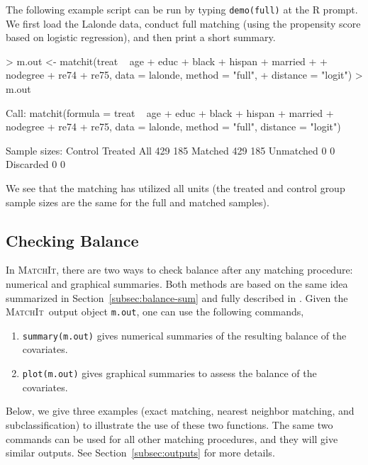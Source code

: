 \documentclass[oneside,letterpaper,titlepage]{article}
\newcommand{\MatchIt}{\textsc{MatchIt}}
\begin{document}
The following example script can be run by typing {\tt demo(full)} at
the R prompt.  We first load the Lalonde data, conduct full matching
(using the propensity score based on logistic regression), and then
print a short summary.
\begin{Schunk}
\begin{Sinput}
> m.out <- matchit(treat ~ age + educ + black + hispan + married + 
+     nodegree + re74 + re75, data = lalonde, method = "full", 
+     distance = "logit")
> m.out
\end{Sinput}
\begin{Soutput}
Call: 
matchit(formula = treat ~ age + educ + black + hispan + married + 
    nodegree + re74 + re75, data = lalonde, method = "full", 
    distance = "logit")

Sample sizes:
          Control Treated
All           429     185
Matched       429     185
Unmatched       0       0
Discarded       0       0
\end{Soutput}
\end{Schunk}
We see that the matching has utilized all units (the treated and
control group sample sizes are the same for the full and matched
samples). 


\subsection{Checking Balance}
\label{subsec:balance}

In \MatchIt, there are two ways to check balance after any matching
procedure: numerical and graphical summaries. Both methods are based
on the same idea summarized in Section~\ref{subsec:balance-sum} and
fully described in \citet*{HoImaKin05}. Given the \MatchIt\ output
object {\tt m.out}, one can use the following commands,
\begin{enumerate}
\item \texttt{summary(m.out)} gives numerical summaries of the
  resulting balance of the covariates.
  
\item \texttt{plot(m.out)} gives graphical summaries to assess the balance
  of the covariates.
\end{enumerate}
Below, we give three examples (exact matching, nearest neighbor
matching, and subclassification) to illustrate the use of these two
functions. The same two commands can be used for all other matching
procedures, and they will give similar outputs. See
Section~\ref{subsec:outputs} for more details.
\end{document}
